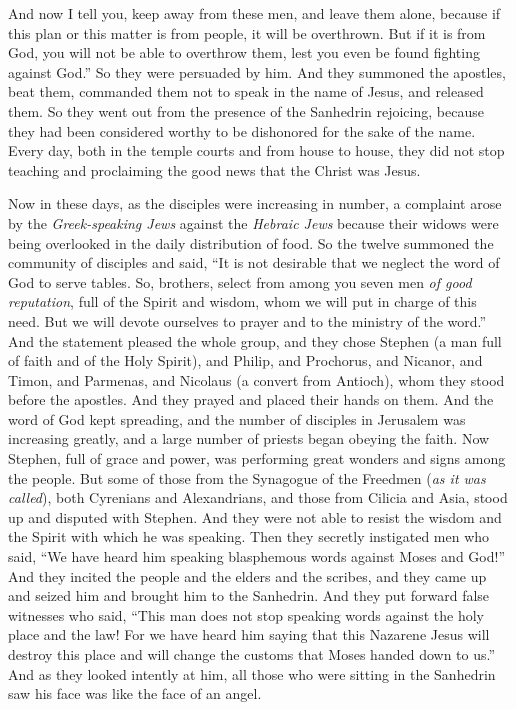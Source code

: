 \begin{biblechapter}
\verse And now I tell you, keep away from these men, and leave them alone, because if this plan or this matter is from people, it will be overthrown.
\verse But if it is from God, you will not be able to overthrow them, lest you even be found fighting against God.” So they were persuaded by him.
\verse And they summoned the apostles, beat them, commanded them not to speak in the name of Jesus, and released them.
\verse So they went out from the presence of the Sanhedrin rejoicing, because they had been considered worthy to be dishonored for the sake of the name.
\verse Every day, both in the temple courts and from house to house, they did not stop teaching and proclaiming the good news that the Christ was Jesus.
\end{biblechapter}

\begin{biblechapter} %
 Now in these days, as the disciples were increasing in number, a complaint arose by the \textit{Greek-speaking Jews} against the \textit{Hebraic Jews} because their widows were being overlooked in the daily distribution of food.
\verse So the twelve summoned the community of disciples and said, “It is not desirable that we neglect the word of God to serve tables.
\verse So, brothers, select from among you seven men \textit{of good reputation}, full of the Spirit and wisdom, whom we will put in charge of this need.
\verse But we will devote ourselves to prayer and to the ministry of the word.”
\verse And the statement pleased the whole group, and they chose Stephen (a man full of faith and of the Holy Spirit), and Philip, and Prochorus, and Nicanor, and Timon, and Parmenas, and Nicolaus (a convert from Antioch),
\verse whom they stood before the apostles. And they prayed and placed their hands on them.
\verse And the word of God kept spreading, and the number of disciples in Jerusalem was increasing greatly, and a large number of priests began obeying the faith.
 Now Stephen, full of grace and power, was performing great wonders and signs among the people.
\verse But some of those from the Synagogue of the Freedmen (\textit{as it was called}), both Cyrenians and Alexandrians, and those from Cilicia and Asia, stood up and disputed with Stephen.
\verse And they were not able to resist the wisdom and the Spirit with which he was speaking.
\verse Then they secretly instigated men who said, “We have heard him speaking blasphemous words against Moses and God!”
\verse And they incited the people and the elders and the scribes, and they came up and seized him and brought him to the Sanhedrin.
\verse And they put forward false witnesses who said, “This man does not stop speaking words against the holy place and the law!
\verse For we have heard him saying that this Nazarene Jesus will destroy this place and will change the customs that Moses handed down to us.”
\verse And as they looked intently at him, all those who were sitting in the Sanhedrin saw his face was like the face of an angel.
\end{biblechapter}

